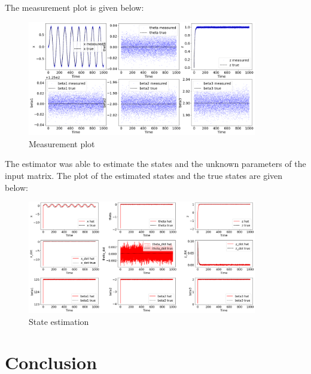 \documentclass[12pt]{article}
\begin{document}
The measurement plot is given below:
\begin{figure}[h!]
    \centering
    \includegraphics[width=10cm]{figures/phase_02_measurement1.png}
    \caption{Measurement plot}
    \label{fig:03}
\end{figure}
The estimator was able to estimate the states and the unknown parameters of the input matrix. The plot of the estimated states and the true states are given below:
\begin{figure}[h!]
    \centering
    \includegraphics[width=10cm]{figures/phase_02_states1.png}
    \caption{State estimation}
    \label{fig:04}
\end{figure}

\section*{Conclusion}

\pagebreak


\end{document}
